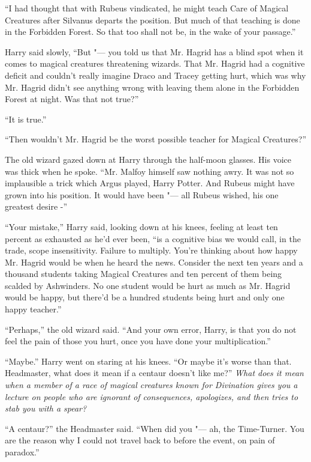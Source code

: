 ``I had thought that with Rubeus vindicated, he might teach Care of
Magical Creatures after Silvanus departs the position. But much of that
teaching is done in the Forbidden Forest. So that too shall not be, in
the wake of your passage.''

Harry said slowly, ``But "--- you told us that Mr. Hagrid has a blind spot
when it comes to magical creatures threatening wizards. That Mr. Hagrid
had a cognitive deficit and couldn't really imagine Draco and Tracey
getting hurt, which was why Mr. Hagrid didn't see anything wrong with
leaving them alone in the Forbidden Forest at night. Was that not
true?''

``It is true.''

``Then wouldn't Mr. Hagrid be the worst possible teacher for Magical
Creatures?''

The old wizard gazed down at Harry through the half-moon glasses. His
voice was thick when he spoke. ``Mr. Malfoy himself saw nothing awry. It
was not so implausible a trick which Argus played, Harry Potter. And
Rubeus might have grown into his position. It would have been "--- all
Rubeus wished, his one greatest desire -''

``Your mistake,'' Harry said, looking down at his knees, feeling at
least ten percent as exhausted as he'd ever been, ``is a cognitive bias
we would call, in the trade, scope insensitivity. Failure to multiply.
You're thinking about how happy Mr. Hagrid would be when he heard the
news. Consider the next ten years and a thousand students taking Magical
Creatures and ten percent of them being scalded by Ashwinders. No one
student would be hurt as much as Mr. Hagrid would be happy, but there'd
be a hundred students being hurt and only one happy teacher.''

``Perhaps,'' the old wizard said. ``And your own error, Harry, is that
you do not feel the pain of those you hurt, once you have done your
multiplication.''

``Maybe.'' Harry went on staring at his knees. ``Or maybe it's worse
than that. Headmaster, what does it mean if a centaur doesn't like me?''
\emph{What does it mean when a member of a race of magical creatures
known for Divination gives you a lecture on people who are ignorant of
consequences, apologizes, and then tries to stab you with a spear?}

``A centaur?'' the Headmaster said. ``When did you "--- ah, the
Time-Turner. You are the reason why I could not travel back to before
the event, on pain of paradox.''


